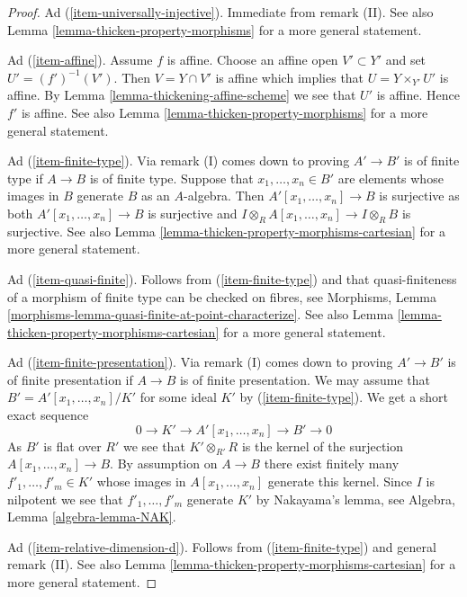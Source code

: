 \begin{proof}
\medskip\noindent
Ad (\ref{item-universally-injective}). Immediate from remark (II). See also
Lemma \ref{lemma-thicken-property-morphisms} for a more general statement.

\medskip\noindent
Ad (\ref{item-affine}). Assume $f$ is affine.  Choose an
affine open $V' \subset Y'$ and set $U' = (f')^{-1}(V')$.
Then $V = Y \cap V'$ is affine which implies that
$U = Y \times_{Y'} U'$ is affine. By
Lemma \ref{lemma-thickening-affine-scheme}
we see that $U'$ is affine. Hence $f'$ is affine. See also
Lemma \ref{lemma-thicken-property-morphisms} for a more general statement.

\medskip\noindent
Ad (\ref{item-finite-type}). Via remark (I) comes down to proving $A' \to B'$
is of finite type if $A \to B$ is of finite type. Suppose that
$x_1, \ldots, x_n \in B'$ are elements whose images in $B$ generate $B$
as an $A$-algebra. Then $A'[x_1, \ldots, x_n] \to B$ is surjective
as both $A'[x_1, \ldots, x_n] \to B$ is surjective and
$I \otimes_R A[x_1, \ldots, x_n] \to I \otimes_R B$ is surjective. See also
Lemma \ref{lemma-thicken-property-morphisms-cartesian}
for a more general statement.

\medskip\noindent
Ad (\ref{item-quasi-finite}). Follows from (\ref{item-finite-type}) and that
quasi-finiteness of a morphism of finite type can be checked on fibres, see
Morphisms, Lemma \ref{morphisms-lemma-quasi-finite-at-point-characterize}.
See also Lemma \ref{lemma-thicken-property-morphisms-cartesian}
for a more general statement.

\medskip\noindent
Ad (\ref{item-finite-presentation}). Via remark (I) comes down to proving
$A' \to B'$ is of finite presentation if $A \to B$ is of finite presentation.
We may assume that $B' = A'[x_1, \ldots, x_n]/K'$ for some ideal $K'$ by
(\ref{item-finite-type}). We get a short exact sequence
$$
0 \to K' \to A'[x_1, \ldots, x_n] \to B' \to 0
$$
As $B'$ is flat over $R'$ we see that $K' \otimes_{R'} R$ is the kernel of
the surjection $A[x_1, \ldots, x_n] \to B$. By assumption on $A \to B$ there
exist finitely many $f'_1, \ldots, f'_m \in K'$ whose images in
$A[x_1, \ldots, x_n]$ generate this kernel. Since $I$ is nilpotent we see
that $f'_1, \ldots, f'_m$ generate $K'$ by Nakayama's lemma, see
Algebra, Lemma \ref{algebra-lemma-NAK}.

\medskip\noindent
Ad (\ref{item-relative-dimension-d}). Follows from (\ref{item-finite-type})
and general remark (II). See also
Lemma \ref{lemma-thicken-property-morphisms-cartesian}
for a more general statement.


\end{proof}
